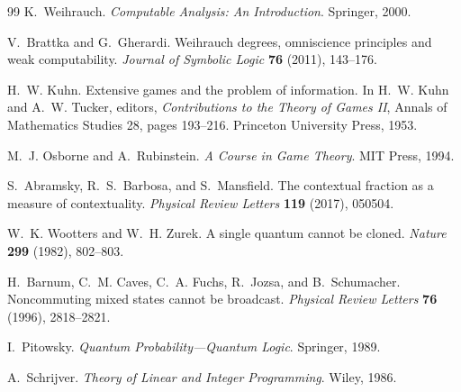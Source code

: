 \documentclass[11pt]{article}
\theoremstyle{plain}
\theoremstyle{definition}
\theoremstyle{remark}
\begin{document}
\begin{thebibliography}{99}
K.~Weihrauch. \emph{Computable Analysis: An Introduction}. Springer, 2000.


V.~Brattka and G.~Gherardi. Weihrauch degrees, omniscience principles and weak
computability. \emph{Journal of Symbolic Logic} \textbf{76} (2011), 143--176.

H.~W. Kuhn. Extensive games and the problem of information. In H.~W. Kuhn and
A.~W. Tucker, editors, \emph{Contributions to the Theory of Games II},
Annals of Mathematics Studies 28, pages 193--216. Princeton University Press,
1953.

M.~J. Osborne and A.~Rubinstein. \emph{A Course in Game Theory}. MIT Press,
1994.

S.~Abramsky, R.~S.~Barbosa, and S.~Mansfield. The contextual fraction as a
measure of contextuality. \emph{Physical Review Letters} \textbf{119} (2017),
050504.

W.~K. Wootters and W.~H. Zurek. A single quantum cannot be cloned.
\emph{Nature} \textbf{299} (1982), 802--803.

H.~Barnum, C.~M. Caves, C.~A. Fuchs, R.~Jozsa, and B.~Schumacher.
Noncommuting mixed states cannot be broadcast. \emph{Physical Review Letters}
\textbf{76} (1996), 2818--2821.

I.~Pitowsky. \emph{Quantum Probability---Quantum Logic}. Springer, 1989.


A.~Schrijver. \emph{Theory of Linear and Integer Programming}. Wiley, 1986.

\end{thebibliography}
\end{document}
